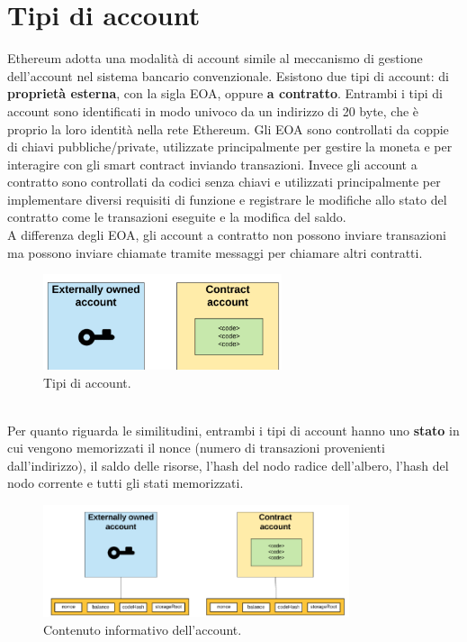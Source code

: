 \documentclass[a4paper,11pt]{report}
\begin{document}
\section{Tipi di account}
Ethereum adotta una modalità di account simile al meccanismo di gestione dell'account nel sistema bancario convenzionale. Esistono due tipi di account: di \textbf{proprietà esterna}, con la sigla EOA, oppure \textbf{a contratto}. Entrambi i tipi di account sono identificati in modo univoco da un indirizzo di 20 byte, che è proprio la loro identità nella rete Ethereum. Gli EOA sono controllati da coppie di chiavi pubbliche/private, utilizzate principalmente per gestire la moneta e per interagire con gli smart contract inviando transazioni. Invece gli account a contratto sono controllati da codici senza chiavi e utilizzati principalmente per implementare diversi requisiti di funzione e registrare le modifiche allo stato del contratto come le transazioni eseguite e la modifica del saldo.\\
A differenza degli EOA, gli account a contratto non possono inviare transazioni ma possono inviare chiamate tramite messaggi per chiamare altri contratti.\\
\begin{figure}[htbp] 
\begin{center}
\includegraphics[width=7cm]{img/ac.png} 
\end{center}
\caption{Tipi di account. \cite{genesis}}
\end{figure}
\\Per quanto riguarda le similitudini, entrambi i tipi di account hanno uno \textbf{stato} in cui vengono memorizzati il nonce (numero di transazioni provenienti dall'indirizzo), il saldo delle risorse, l'hash del nodo radice dell'albero, l'hash del nodo corrente e tutti gli stati memorizzati. \\
\begin{figure}[htbp] 
\begin{center}
\includegraphics[width=9cm]{img/ndi.png} 
\end{center}
\caption{Contenuto informativo dell'account. \cite{genesis}}
\end{figure}
\end{document}
